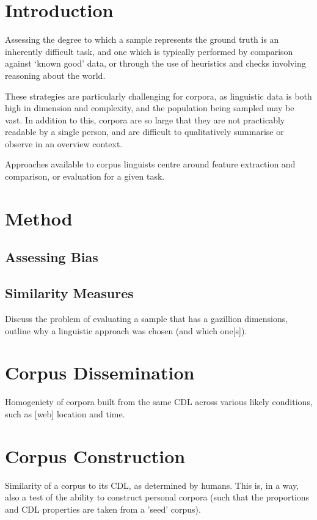 \section{Introduction}
Assessing the degree to which a sample represents the ground truth is an inherently difficult task, and one which is typically performed by comparison against `known good' data, or through the use of heuristics and checks involving reasoning about the world.

These strategies are particularly challenging for corpora, as linguistic data is both high in dimension and complexity, and the population being sampled may be vast.  In addition to this, corpora are so large that they are not practicably readable by a single person, and are difficult to qualitatively summarise or observe in an overview context.

Approaches available to corpus linguists centre around feature extraction and comparison, or evaluation for a given task.  






\section{Method}
\subsection{Assessing Bias}

\subsection{Similarity Measures}
Discuss the problem of evaluating a sample that has a gazillion dimensions, outline why a linguistic approach was chosen (and which one[s]).







\section{Corpus Dissemination}
Homogeniety of corpora built from the same CDL across various likely conditions, such as [web] location and time.


\section{Corpus Construction}
Similarity of a corpus to its CDL, as determined by humans.  This is, in a way, also a test of the ability to construct personal corpora (such that the proportions and CDL properties are taken from a 'seed' corpus).





